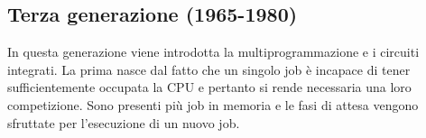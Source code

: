 \subsection{Terza generazione (1965-1980)}
In questa generazione viene introdotta la multiprogrammazione e i circuiti integrati. La prima nasce dal fatto che un singolo job \`e incapace di tener sufficientemente occupata la CPU e pertanto si rende 
necessaria una loro competizione. Sono presenti pi\`u job in memoria e le fasi di attesa vengono sfruttate per l'esecuzione di un nuovo job. 
